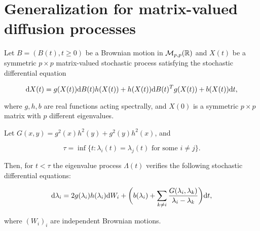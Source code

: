 \section{Generalization for matrix-valued diffusion processes} \label{sec:matrix_difusions}

\begin{theorem} \label{thm:diffusion_real}
    Let $B = (B(t), t\ge 0)$ be a Brownian motion in $\mathcal M_{p,p}(\mathbb R)$ and $X(t)$ be a symmetric $p\times p$ matrix-valued stochastic process satisfying the stochastic differential equation

    \begin{equation}
        \mathrm d X(t) = g(X(t)) \mathrm d B(t) h(X(t)) + h(X(t)) \mathrm d B(t)^T g(X(t)) + b(X(t))\mathrm d t, \label{eq:matrix_diffusion}
    \end{equation}

    where $g,h,b$ are real functions acting spectrally, and $X(0)$ is a symmetric $p\times p$ matrix with $p$ different eigenvalues. 

    Let $G(x,y) = g^2(x)h^2(y) + g^2(y)h^2(x)$, and
    
    \begin{equation}
        \tau = \inf\{ t: \lambda_i(t) = \lambda_j(t) \text{ for some } i\neq j \}. \label{eq:collision_time}
    \end{equation} 
    
    Then, for $t < \tau$ the eigenvalue process $\Lambda(t)$ verifies the following stochastic differential equations:

    \begin{equation}
        \mathrm d \lambda_i = 2g(\lambda_i)h(\lambda_i)\mathrm d W_i + \biggl( b(\lambda_i) + \sum_{k\neq i} \frac{G(\lambda_i,\lambda_k)}{\lambda_i - \lambda_k} \biggr)\mathrm d t, \label{eq:gen_dyson}
    \end{equation}

    \noindent where $(W_i)_{i}$ are independent Brownian motions.
\end{theorem}

